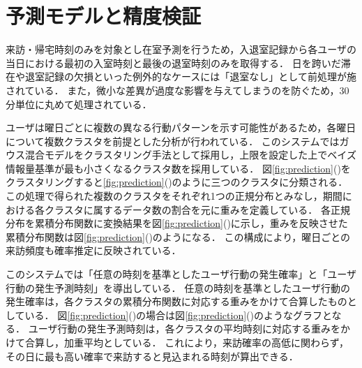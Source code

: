 \section{予測モデルと精度検証}
来訪・帰宅時刻のみを対象とし在室予測を行うため，入退室記録から各ユーザの当日における最初の入室時刻と最後の退室時刻のみを取得する．
日を跨いだ滞在や退室記録の欠損といった例外的なケースには「退室なし」として前処理が施されている．
また，微小な差異が過度な影響を与えてしまうのを防ぐため，30分単位に丸めて処理されている．


ユーザは曜日ごとに複数の異なる行動パターンを示す可能性があるため，各曜日について複数クラスタを前提とした分析が行われている．
このシステムではガウス混合モデルをクラスタリング手法として採用し，上限を設定した上でベイズ情報量基準が最も小さくなるクラスタ数を採用している．
図\ref{fig:prediction}()をクラスタリングすると\ref{fig:prediction}()のように三つのクラスタに分類される．
この処理で得られた複数のクラスタをそれぞれ1つの正規分布とみなし，期間における各クラスタに属するデータ数の割合を元に重みを定義している．
各正規分布を累積分布関数に変換結果を図\ref{fig:prediction}()に示し，重みを反映させた累積分布関数は図\ref{fig:prediction}()のようになる．
この構成により，曜日ごとの来訪頻度も確率推定に反映されている．


このシステムでは「任意の時刻を基準としたユーザ行動の発生確率」と「ユーザ行動の発生予測時刻」を導出している．
任意の時刻を基準としたユーザ行動の発生確率は，各クラスタの累積分布関数に対応する重みをかけて合算したものとしている．
図\ref{fig:prediction}()の場合は図\ref{fig:prediction}()のようなグラフとなる．
ユーザ行動の発生予測時刻は，各クラスタの平均時刻に対応する重みをかけて合算し，加重平均としている．
これにより，来訪確率の高低に関わらず，その日に最も高い確率で来訪すると見込まれる時刻が算出できる．

